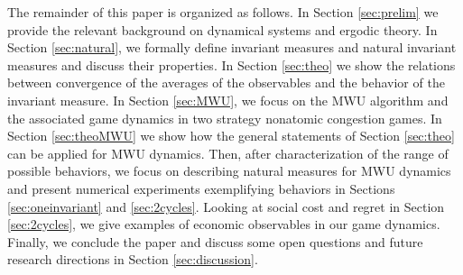 \documentclass[format=acmsmall, authorversion, screen=true]{acmart}
\begin{document}
The remainder of this paper is organized as follows.
In Section \ref{sec:prelim} we provide the relevant background on dynamical systems and ergodic theory.
In Section \ref{sec:natural}, we formally define invariant measures and natural invariant measures and discuss their properties.
In Section \ref{sec:theo} we show the relations between convergence of the averages of the observables and the behavior of the invariant measure.
In Section \ref{sec:MWU}, we focus on the MWU algorithm and the associated game dynamics in two strategy nonatomic congestion games. In Section \ref{sec:theoMWU} we show how the general statements of Section \ref{sec:theo} can be applied for MWU dynamics. Then, after characterization of the range of possible behaviors, we focus on describing natural measures for MWU dynamics and present numerical experiments exemplifying behaviors in Sections \ref{sec:oneinvariant} and \ref{sec:2cycles}. 
Looking at social cost and regret in Section \ref{sec:2cycles}, we give examples of economic observables in our game dynamics.
Finally, we conclude the paper and discuss some open questions and future research directions in Section \ref{sec:discussion}.



\end{document}
